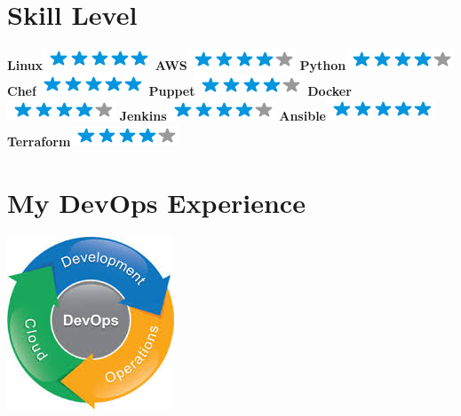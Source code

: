\documentclass[]{friggeri-cv}
\begin{document}
\begin{aside}
  \section{Skill Level}
    \textbf{Linux}\includegraphics[scale=0.40]{img/5stars.png}
    \textbf{AWS}\includegraphics[scale=0.40]{img/4stars.png}
    \textbf{Python}\includegraphics[scale=0.40]{img/4stars.png}
    \textbf{Chef}\includegraphics[scale=0.40]{img/5stars.png}
    \textbf{Puppet}\includegraphics[scale=0.40]{img/4stars.png}
    \textbf{Docker}\includegraphics[scale=0.40]{img/4stars.png}
    \textbf{Jenkins}\includegraphics[scale=0.40]{img/4stars.png}
    \textbf{Ansible}\includegraphics[scale=0.40]{img/5stars.png}
    \textbf{Terraform}\includegraphics[scale=0.40]{img/4stars.png}
    ~
  \section{My DevOps Experience}
    \includegraphics[scale=0.62]{img/second.jpg}
    ~
\end{aside}
\end{document}
